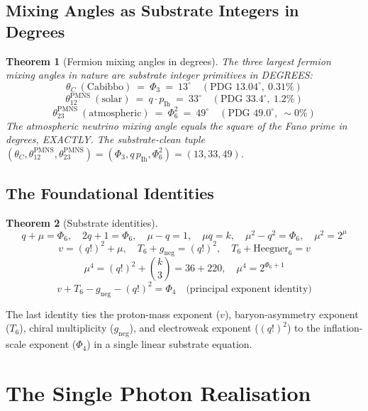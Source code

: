 \documentclass[11pt]{article}
\newtheorem{theorem}{Theorem}[section]
\begin{document}
\subsection{Mixing Angles as Substrate Integers in Degrees}

\begin{theorem}[Fermion mixing angles in degrees]\label{thm:angles_degrees}
The three largest fermion mixing angles in nature are substrate
integer primitives in DEGREES:
\[
  \theta_{C}\ (\text{Cabibbo})\ =\ \Phi_3\ =\ 13^\circ \quad (\text{PDG } 13.04^\circ,\ 0.31\%)
\]
\[
  \theta_{12}^{\mathrm{PMNS}}\ (\text{solar})\ =\ q\cdot p_{\mathrm{Ih}}\ =\ 33^\circ \quad (\text{PDG } 33.4^\circ,\ 1.2\%)
\]
\[
  \theta_{23}^{\mathrm{PMNS}}\ (\text{atmospheric})\ =\ \Phi_6^2\ =\ 49^\circ \quad (\text{PDG } 49.0^\circ,\ \sim 0\%)
\]
The atmospheric neutrino mixing angle equals the square of the Fano
prime in degrees, EXACTLY.  The substrate-clean tuple
$(\theta_C, \theta^{\mathrm{PMNS}}_{12}, \theta^{\mathrm{PMNS}}_{23})
 = (\Phi_3, q\,p_{\mathrm{Ih}}, \Phi_6^2) = (13, 33, 49)$.
\end{theorem}

\subsection{The Foundational Identities}

\begin{theorem}[Substrate identities]\label{thm:structural}
\[ q + \mu = \Phi_6, \quad 2q + 1 = \Phi_6, \quad \mu - q = 1,
   \quad \mu q = k, \quad \mu^2 - q^2 = \Phi_6, \quad \mu^2 = 2^\mu \]
\[ v = (q!)^2 + \mu, \quad T_6 + g_{\mathrm{neg}} = (q!)^2,
   \quad T_6 + \mathrm{Heegner}_6 = v \]
\[ \mu^4 = (q!)^2 + \binom{k}{3} = 36 + 220, \quad \mu^4 = 2^{\Phi_6+1} \]
\[ v + T_6 - g_{\mathrm{neg}} - (q!)^2 = \Phi_4 \quad \text{(principal exponent identity)} \]
\end{theorem}

The last identity ties the proton-mass exponent ($v$), baryon-asymmetry
exponent ($T_6$), chiral multiplicity ($g_{\mathrm{neg}}$), and
electroweak exponent ($(q!)^2$) to the inflation-scale exponent
($\Phi_4$) in a single linear substrate equation.

\section{The Single Photon Realisation}
\end{document}
